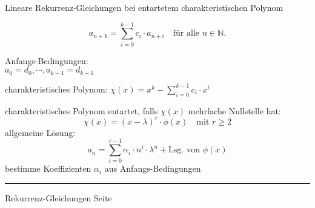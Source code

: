 \documentclass{slides}
\newcommand{\N}{{\mathbb N}}
\newcounter{mypage}
\begin{document}
\begin{slide}{}
 \begin{center}
  Lineare Rekurrenz-Gleichungen bei
  entartetem charakteristischen Polynom
\end{center}

\footnotesize
\[a_{n+k} = \sum\limits_{i=0}^{k-1} c_i \cdot a_{n+i} \quad
     \mbox{f\"ur alle $n \in \N$}.\] 

Anfangs-Bedingungen:
\\[0.3cm]
\hspace*{1.3cm}      
$a_0 = d_0, \cdots, a_{k-1} = d_{k-1}$ 

charakteristisches Polynom: \quad $\chi(x) = x^{k} - \sum\limits_{i=0}^{k-1} c_i \cdot x^{i}$  

charakteristisches Polynom entartet, falls $\chi(x)$ mehrfache Nullstelle hat:
\[
\chi(x) = (x - \lambda)^r \cdot \phi(x) \quad \mbox{mit $r \geq 2$}
\]
allgemeine L\"osung: 
\[ a_n = \sum\limits_{i=0}^{r-1} \alpha_i \cdot n^i \cdot \lambda^n + \mbox{Lsg. von $\phi(x)$} \]
bestimme Koeffizienten $\alpha_i$ aus Anfangs-Bedingungen


\vspace*{\fill}
\tiny \addtocounter{mypage}{1}
\rule{17cm}{1mm}
Rekurrenz-Gleichungen  \hspace*{\fill} Seite 
\end{slide}

\end{document}
